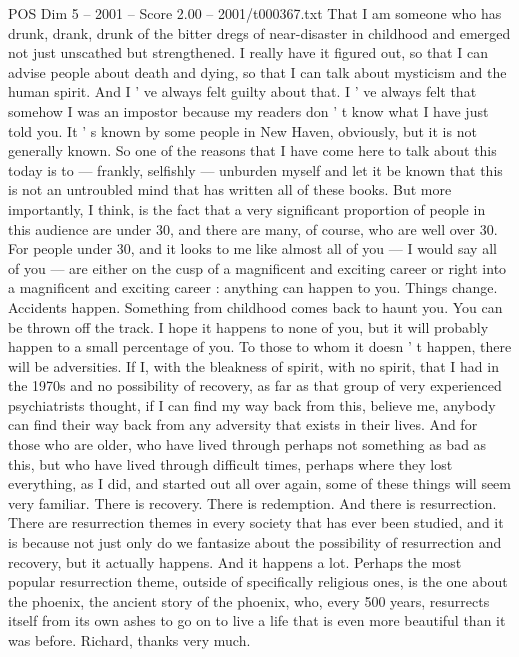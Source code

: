 \begin{textsample}{POS Dim 5 – 2001 – Score 2.00 – 2001/t000367.txt}
That I am someone who has drunk, drank, drunk of the bitter dregs of near-disaster in childhood and emerged not just unscathed but strengthened.
I really have it figured out, so that I can advise people about death and dying, so that I can talk about mysticism and the human spirit.
And I ' ve always felt guilty about that.
I ' ve always felt that somehow I was an impostor because my readers don ' t know what I have just told you.
It ' s known by some people in New Haven, obviously, but it is not generally known.
So one of the reasons that I have come here to talk about this today is to — frankly, selfishly — unburden myself and let it be known that this is not an untroubled mind that has written all of these books.
But more importantly, I think, is the fact that a very significant proportion of people in this audience are under 30, and there are many, of course, who are well over 30.
For people under 30, and it looks to me like almost all of you — I would say all of you — are either on the cusp of a magnificent and exciting career or right into a magnificent and exciting career : anything can happen to you.
Things change.
Accidents happen.
Something from childhood comes back to haunt you.
You can be thrown off the track.
I hope it happens to none of you, but it will probably happen to a small percentage of you.
To those to whom it doesn ' t happen, there will be adversities.
If I, with the bleakness of spirit, with no spirit, that I had in the 1970s and no possibility of recovery, as far as that group of very experienced psychiatrists thought, if I can find my way back from this, believe me, anybody can find their way back from any adversity that exists in their lives.
And for those who are older, who have lived through perhaps not something as bad as this, but who have lived through difficult times, perhaps where they lost everything, as I did, and started out all over again, some of these things will seem very familiar.
There is recovery.
There is redemption.
And there is resurrection.
There are resurrection themes in every society that has ever been studied, and it is because not just only do we fantasize about the possibility of resurrection and recovery, but it actually happens.
And it happens a lot.
Perhaps the most popular resurrection theme, outside of specifically religious ones, is the one about the phoenix, the ancient story of the phoenix, who, every 500 years, resurrects itself from its own ashes to go on to live a life that is even more beautiful than it was before.
Richard, thanks very much.

\end{textsample}
